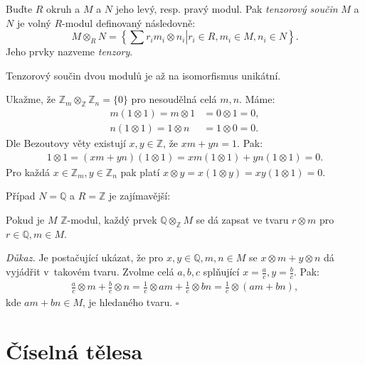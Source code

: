 \documentclass [12pt]{report}
\begin{document}
\begin{definice}
Buďte $R$ okruh a $M$ a $N$ jeho levý, resp. pravý modul. Pak \textit{tenzorový součin} $M$ a $N$  je volný $R$-modul definovaný následovně:
\begin{equation*}
M  \otimes_R N = \left \lbrace \left. \sum r_i m_i \otimes n_i \right\vert r_i \in R, m_i \in M, n_i \in N \right \rbrace.
\end{equation*} 
Jeho prvky nazveme \textit{tenzory}.
\end{definice}

Tenzorový součin dvou modulů je až na isomorfismus unikátní.

\begin{priklad}
Ukažme, že $\mathbb{Z}_m \otimes_{\mathbb{Z}} \mathbb{Z}_n = \lbrace 0 \rbrace$ pro nesoudělná celá $m,n$. Máme:
\begin{align*}
m (1 \otimes 1) = m \otimes 1  &= 0 \otimes 1 = 0,\\
n (1 \otimes 1) = 1 \otimes n &= 1 \otimes 0 = 0.
\end{align*}
Dle Bezoutovy věty existují $x,y \in \mathbb{Z}$, že $xm + yn = 1$. Pak:
\begin{align*}
1 \otimes 1 = (xm+yn)(1 \otimes 1) = xm (1 \otimes 1) + yn (1 \otimes 1) = 0.
\end{align*}
Pro každá $x \in \mathbb{Z}_m, y \in \mathbb{Z}_n$ pak platí $x \otimes y = x(1 \otimes y) = xy (1 \otimes 1)  = 0$.
\end{priklad}

Případ $N = \mathbb{Q}$ a $R = \mathbb{Z}$ je zajímavější:

\begin{veta}\label{qtensor}
Pokud je $M$ $\mathbb{Z}$-modul, každý prvek $\mathbb{Q} \otimes_{\mathbb{Z}} M$ se dá zapsat ve tvaru $r \otimes m$ pro $r \in \mathbb{Q}, m \in M$.
\end{veta}

\textit{Důkaz.} Je postačující ukázat, že pro $x,y \in \mathbb{Q}, m,n \in M$ se $x \otimes m + y \otimes n$ dá vyjádřit v~takovém tvaru. Zvolme celá $a,b,c$ splňující $x = \frac{a}{c}, y = \frac{b}{c}$. Pak:
\begin{align*}
\frac{a}{c} \otimes m + \frac{b}{c} \otimes n = \frac{1}{c} \otimes am + \frac{1}{c} \otimes bn = \frac{1}{c} \otimes (am+bn),
\end{align*}
kde $am+bn \in M$, je hledaného tvaru. \hfill $\square$



\section{Číselná tělesa}
\end{document}
